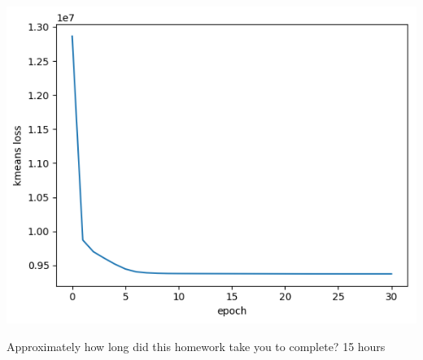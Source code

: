 \documentclass[submit]{harvardml}
\begin{document}
\begin{enumerate}
        \includegraphics[scale=0.8]{figures/loss.png}
\end{enumerate}



\newpage
\begin{problem}[Calibration, 1pt]
Approximately how long did this homework take you to complete?
15 hours
\end{problem}
\end{document}
